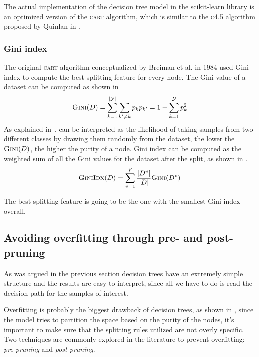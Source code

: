 \medskip

The actual implementation of the decision tree model in the scikit-learn library is an optimized version of
the \textsc{cart} algorithm, which  is similar to the \textsc{c4.5} algorithm proposed by Quinlan in
\cite{quinlan2014c4}.

\subsubsection{Gini index}
The original \textsc{cart} algorithm conceptualized by Breiman et al. in 1984
\cite{breiman1984classification} used Gini index to compute the best splitting feature for every
node. The Gini value of a dataset can be computed as shown in 
\begin{equation}
	\label{eq:gini-value}
	\textsc{Gini}(D) = \sum_{k = 1}^{|\mathcal{Y}|}\sum_{k' \neq k} p_kp_{k'} = 1 - \sum_{k =
		1}^{|\mathcal{Y}|}p_k^2
\end{equation}
As explained in~\cite{ZhouZhi-Hua2021ML},  can be interpreted as the
likelihood of taking samples from two different classes by drawing them randomly from the
dataset, the lower the $\textsc{Gini}(D)$, the higher the purity of a node. Gini index can be
computed as the weighted sum of all the Gini values for the dataset after the split, as shown in
.
\begin{equation}
	\label{eq:gini-index}
	\textsc{GiniIdx}(D) = \sum_{v = 1}^V\frac{|D^v|}{|D|} \textsc{Gini}(D^v)
\end{equation}

The best splitting feature is going to be the one with the smallest Gini index overall.

\subsection{Avoiding overfitting through pre- and post- pruning}
As was argued in the previous section decision trees have an extremely simple structure and the
results are easy to interpret, since all we have to do is read the decision path for the samples of
interest.

Overfitting is probably the biggest drawback of decision trees, as shown in
\cite{overfitting-dt-erblin}, since the model tries to partition the space based on the purity of
the nodes, it's important to make sure that the splitting rules utilized are not overly specific.
Two techniques are commonly explored in the literature to prevent overfitting: \emph{pre-pruning}
and \emph{post-pruning}.

